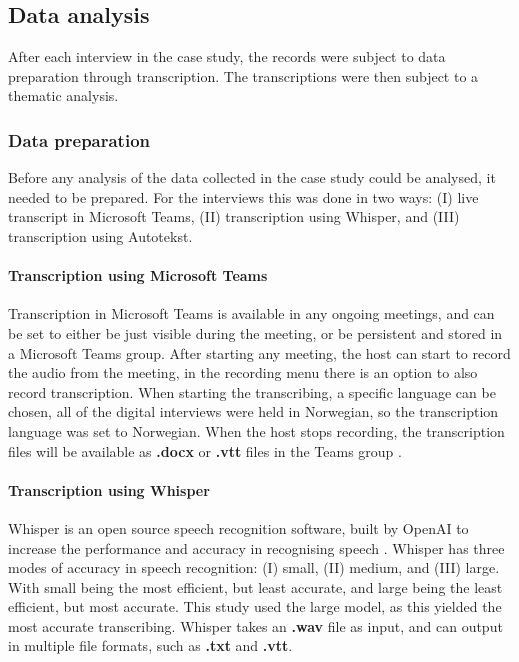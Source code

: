 \subsection{Data analysis}
After each interview in the case study, the records were subject to data preparation through transcription. The transcriptions were then subject to a thematic analysis.

\subsubsection{Data preparation}
Before any analysis of the data collected in the case study could be analysed, it needed to be prepared. For the interviews this was done in two ways: (I) live transcript in Microsoft Teams, (II) transcription using Whisper, and (III) transcription using Autotekst.

\paragraph{Transcription using Microsoft Teams}
Transcription in Microsoft Teams is available in any ongoing meetings, and can be set to either be just visible during the meeting, or be persistent and stored in a Microsoft Teams group. After starting any meeting, the host can start to record the audio from the meeting, in the recording menu there is an option to also record transcription. When starting the transcribing, a specific language can be chosen, all of the digital interviews were held in Norwegian, so the transcription language was set to Norwegian. When the host stops recording, the transcription files will be available as \textbf{.docx} or \textbf{.vtt} files in the Teams group \cite{mt_2022}.

\paragraph{Transcription using Whisper}
Whisper is an open source speech recognition software, built by OpenAI to increase the performance and accuracy in recognising speech \cite{oa_2022}. Whisper has three modes of accuracy in speech recognition: (I) small, (II) medium, and (III) large. With small being the most efficient, but least accurate, and large being the least efficient, but most accurate. This study used the large model, as this yielded the most accurate transcribing. Whisper takes an \textbf{.wav} file as input, and can output in multiple file formats, such as \textbf{.txt} and \textbf{.vtt}.

